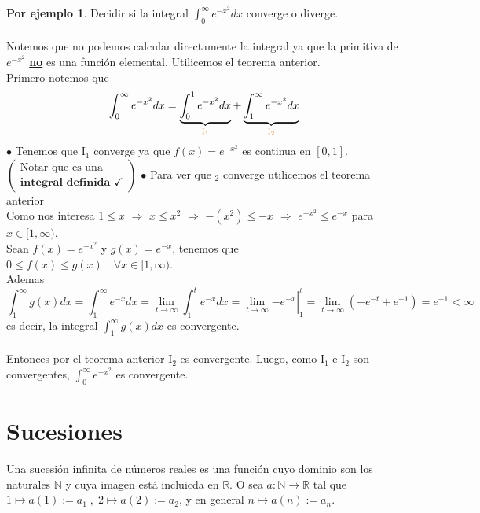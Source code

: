 \documentclass{article}
\theoremstyle{definition}
\newtheorem*{ej}{Por ejemplo}
\theoremstyle{remark}
\newcommand\N{\ensuremath{\mathbb{N}}}
\newcommand\R{\ensuremath{\mathbb{R}}}
\newcommand\ok{\checkmark}
\newcommand\infi{\infty}
\begin{document}
\begin{ej}
Decidir si la integral $\int_{0}^{\infi}{e^{-x^2}dx}$ converge o diverge. \\
\\
Notemos que no podemos calcular directamente la integral ya que la primitiva de $e^{-x^2}$ \underline{\textbf{no}} es una función elemental. Utilicemos el teorema anterior.\\
Primero notemos que \[
\int_{0}^{\infi}{e^{-x^2}dx}
=
\underbrace{\int_{0}^{1}{e^{-x^2}dx}}_{\textcolor{rojop2}{\text{I}_1}}
+
\underbrace{\int_{1}^{\infi}{e^{-x^2}dx}}_{\textcolor{rojop2}{\text{I}_2}}
\]
$\bullet$ Tenemos que \textcolor{rojop2}{I$_1$} converge ya que $f(x)=e^{-x^2}$ es continua en $[0,1]$. \quad $\left(
\begin{array}{l}
  \text{Notar que es una} \\
  \textbf{integral definida $\ok$}
\end{array}
\right)$
$\bullet$ Para ver que $ $\textcolor{rojop2}{$_2$} converge utilicemos el teorema anterior \\
Como nos interesa $1 \leq x $ \;$\Rightarrow$\; $x \leq x^2 $ \;$\Rightarrow$\; $-(x^2)\leq -x$ \;$\Rightarrow$\; $e^{-x^2}\leq e^{-x}$ para $x \in [1,\infi)$. \\
Sean $f(x)=e^{-x^2}$ y $g(x)=e^{-x}$, tenemos que $0 \leq f(x) \leq g(x)\quad \forall x \in [1,\infi)$. \\
Ademas \[
\int_1^\infi {g(x)dx}
=
\int_1^\infi {e^{-x}dx}
=
\lim_{t\to \infi} {\int_1^t {e^{-x}dx}
=
\left.\lim_{t \to \infi}{-e^{-x}}\right\vert_1^t
=
\lim_{t \to \infi} {\left(-e^{-t}+e^{-1} \right)}
=
e^{-1} < \infi
}
\]
es decir, la integral $\int_1^\infi g(x)dx$ es convergente.
\\\\Entonces por el teorema anterior \textcolor{rojop2}{I$_2$} es convergente.
Luego, como \textcolor{rojop2}{I$_1$} e \textcolor{rojop2}{I$_2$} son convergentes, $\int_0^\infi e^{-x^2}$ es convergente.
\end{ej}


\section{Sucesiones}
\begin{defi}
Una sucesión infinita de números reales es una función cuyo dominio son los naturales $\N$ y cuya imagen está incluicda en $\R$. O sea $a : \N \to \R $ tal que $1 \mapsto a(1) := a_1 \; ,\;  2 \mapsto a(2) := a_2 $, y en general $n \mapsto a(n) := a_n$.
\end{defi}
\end{document}
